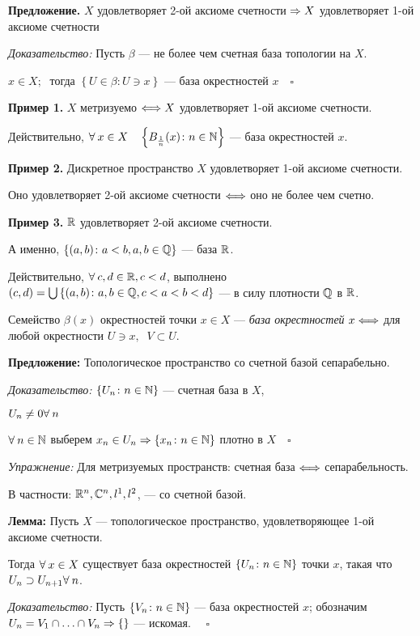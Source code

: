 \documentclass[../../main.tex]{subfiles}
\begin{document}
\textbf{Предложение.} $X$ удовлетворяет 2-ой аксиоме счетности $\Rightarrow X$ удовлетворяет 1-ой аксиоме счетности

\textit{Доказательство:} Пусть $\beta$ — не более чем счетная база топологии на $X$.

$x \in X; \;$ тогда $\left\{ U \in \beta \colon U \ni x \right\}$ — база окрестностей $x \quad \square$

\textbf{Пример 1.} $X$ метризуемо $\Longleftrightarrow X$ удовлетворяет 1-ой аксиоме счетности.

Действительно, $\forall\: x \in X \quad \left\{ B_{\frac 1 n}(x) \colon n \in \mathbb{N} \right\}$ — база окрестностей $x$.

\textbf{Пример 2.} Дискретное пространство $X$ удовлетворяет 1-ой аксиоме счетности.

Оно удовлетворяет 2-ой аксиоме счетности $\Longleftrightarrow$ оно не более чем счетно.

\textbf{Пример 3.} $\mathbb{R}$ удовлетворяет 2-ой аксиоме счетности.

А именно, $\left\{ (a, b) \colon a < b, a, b \in \mathbb{Q} \right\}$ — база $\mathbb{R}$.

Действительно, $\forall\: c, d \in \mathbb{R}, c < d$,
 выполнено $(c, d) = \bigcup\left\{ (a, b) \colon a, b \in \mathbb{Q}, c < a < b < d \right\}$ — в силу плотности $\mathbb{Q}$ в $\mathbb{R}$.

 Семейство $\beta(x)$ окрестностей точки $x \in X$ — \textit{база окрестностей} $x \Longleftrightarrow$ для любой окрестности $U \ni x,\;\; V \subset U$. 

\textbf{Предложение:} Топологическое пространство со счетной базой сепарабельно.

\textit{Доказательство:} $\left\{U_n \colon n \in \mathbb{N} \right\}$ — счетная база в $X$,

$U_n \neq 0 \forall\: n$

$\forall\: n \in \mathbb{N}$ выберем $x_n \in U_n \Rightarrow \left\{ x_n \colon n \in \mathbb{N} \right\}$ плотно в $X \quad \square$

\textit{Упражнение:} Для метризуемых пространств: счетная база $\Longleftrightarrow$ сепарабельность.

В частности: $\mathbb{R}^n, \mathbb{C}^n, l^1, l^2$, — со счетной базой.

\textbf{Лемма:} Пусть $X$ — топологическое пространство, удовлетворяющее 1-ой аксиоме счетности.

Тогда $\forall\: x \in X$ существует база окрестностей $\left\{ U_n \colon n \in \mathbb{N} \right\}$ точки $x$, такая что $U_n \supset U_{n+1} \forall\: n$.

\textit{Доказательство:} Пусть $\left\{ V_n \colon n \in \mathbb{N} \right\}$ — база окрестностей $x$; обозначим $U_n = V_1 \cap \ldots \cap V_n \Rightarrow \left \{ \right \}$ — искомая. $\quad\square$
\end{document}
